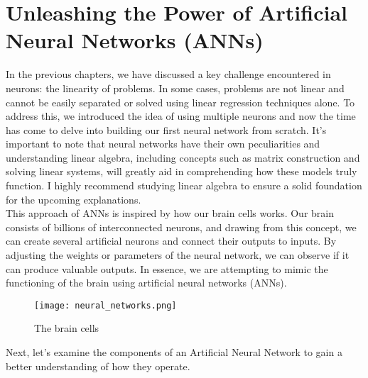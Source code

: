
\section{Unleashing the Power of Artificial Neural Networks (ANNs)}
In the previous chapters, we have discussed a key challenge encountered in neurons: the linearity of problems.
In some cases, problems are not linear and cannot be easily separated or solved using linear regression
techniques alone. To address this, we introduced the idea of using multiple neurons and now the time has
come to delve into building our first neural network from scratch. It's important to note that neural
networks have their own peculiarities and understanding linear algebra, including concepts such as matrix
construction and solving linear systems, will greatly aid in comprehending how these models truly function.
I highly recommend studying linear algebra to ensure a solid foundation for the upcoming explanations.\\

This approach of ANNs
is inspired by how our brain cells works. Our brain consists of billions of interconnected
neurons, and drawing from this concept, we can create
several artificial neurons and connect their outputs to inputs.
By adjusting the weights or parameters of the neural network, we can observe if it can produce valuable outputs.
In essence, we are attempting to mimic the functioning of the brain using artificial neural networks (ANNs).

\begin{figure}[H]
  \centering
  \texttt{[image: neural\_networks.png]}
  \caption{The brain cells}
\end{figure}
Next, let's examine the components of an Artificial
Neural Network to gain a better understanding of how they operate.
